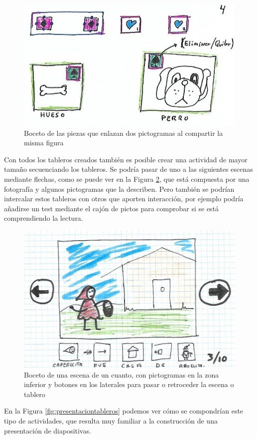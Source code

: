 \begin{figure}[h!]
	\centering
	\includegraphics[width=0.7\linewidth]{Imagenes/Bitmap/componenteEnla}
	\caption{Boceto de las piezas que enlazan dos pictogramas al compartir la misma figura}
	\label{fig:componenteenla}
\end{figure}



Con todos los tableros creados también es posible crear una actividad de mayor tamaño secuenciando los tableros. Se podría pasar de uno a las siguientes escenas mediante flechas, como se puede ver en la Figura \ref{fig:cuento}, que está compuesta por una fotografía y algunos pictogramas que la describen. Pero también se podrían intercalar estos tableros con otros que aporten interacción, por ejemplo podría añadirse un test mediante el cajón de pictos para comprobar si se está comprendiendo la lectura.

\begin{figure}[h!]
	\centering
	\includegraphics[width=0.7\linewidth]{Imagenes/Bitmap/Cuento}
	\caption{Boceto de una escena de un cuanto, con pictogramas en la zona inferior y botones en los laterales para pasar o retroceder la escena o tablero}
	\label{fig:cuento}
\end{figure}


En la Figura \ref{fig:presentaciontableros} podemos ver cómo se compondrían este tipo de actividades, que resulta muy familiar a la construcción de una presentación de diapositivas.  

